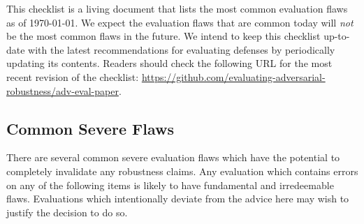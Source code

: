 \documentclass{article} %
\begin{document}
This checklist is a living document that lists the most common evaluation
flaws as of \today. We expect the evaluation flaws that are
common today will \emph{not} be the most common flaws in the future.
%
We intend to keep this checklist up-to-date with the latest recommendations
for evaluating defenses by periodically updating its contents.
Readers should check the following URL  for the most recent
revision of the checklist:
\url{https://github.com/evaluating-adversarial-robustness/adv-eval-paper}.



\subsection{Common Severe Flaws}
There are several common severe evaluation flaws which have the
potential to completely invalidate any robustness claims.
%
Any evaluation which contains errors on any of the following
items is likely to have fundamental and irredeemable flaws.
%
Evaluations which intentionally deviate from the advice here may wish to
justify the decision to do so.
\end{document}
